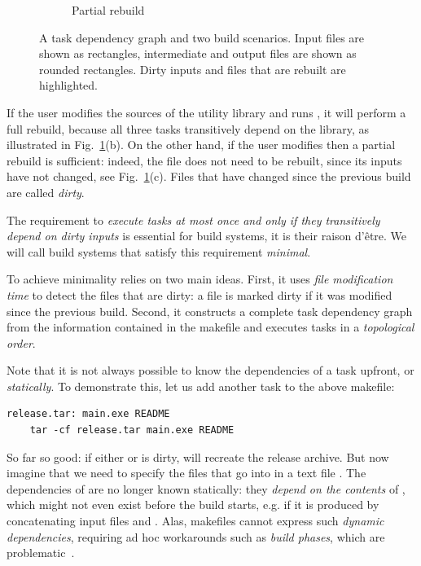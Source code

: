 \begin{figure}[h]
\begin{subfigure}[b]{0.32\linewidth}
\caption{Partial rebuild}
\end{subfigure}
\caption{A task dependency graph and two build scenarios. Input files are shown as
rectangles, intermediate and output files are shown as rounded rectangles. Dirty
inputs and files that are rebuilt are highlighted.
\label{fig-make}}
\end{figure}

If the user modifies the sources of the utility library and runs \Make, it will
perform a full rebuild, because all three tasks transitively depend on the
library, as illustrated in Fig.~\ref{fig-make}(b). On the other hand, if the
user modifies  then a partial rebuild is sufficient: indeed, the
file  does not need to be rebuilt, since its inputs have not
changed, see Fig.~\ref{fig-make}(c). Files that have changed since the previous
build are called \emph{dirty}.

The requirement to \emph{execute tasks at most once and only if they transitively
depend on dirty inputs} is essential for build systems, it is their raison
d'\^etre. We will call build systems that satisfy this requirement \emph{minimal}.

To achieve minimality \Make relies on two main ideas. First, it uses \emph{file
modification time} to detect the files that are dirty: a file is marked dirty if
it was modified since the previous build. Second, it constructs a complete task
dependency graph from the information contained in the makefile and executes
tasks in a \emph{topological order}.

Note that it is not always possible to know the dependencies of a task upfront,
or \emph{statically}. To demonstrate this, let us add another task to the above
makefile:

\vspace{1mm}
\begin{verbatim}
release.tar: main.exe README
    tar -cf release.tar main.exe README
\end{verbatim}
\vspace{1mm}

\noindent
So far so good: if either  or  is dirty, \Make will
recreate the release archive. But now imagine that we need to specify the files
that go into  in a text file . The dependencies
of  are no longer known statically: they \emph{depend on the
contents} of , which might not even exist before the build
starts, e.g. if it is produced by concatenating input files 
and . Alas, makefiles cannot express such \emph{dynamic
dependencies}, requiring ad hoc workarounds such as \emph{build phases}, which
are problematic~\cite{hadrian}.

